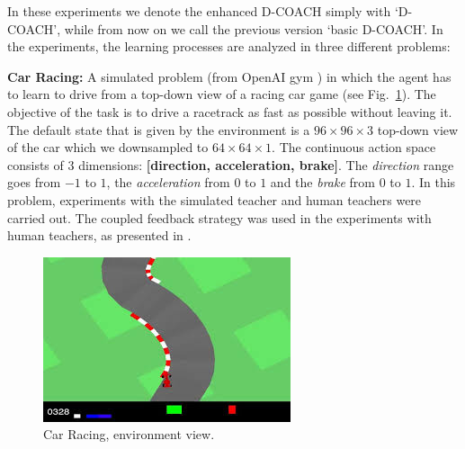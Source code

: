 In these experiments we denote the enhanced D-COACH simply with `D-COACH', while from now on we call the previous version `basic D-COACH'. In the experiments, the learning processes are analyzed in three different problems:

\textbf{Car Racing:} A simulated problem (from OpenAI gym \cite{brockman2016openai}) in which the agent has to learn to drive from a top-down view of a racing car game (see Fig.~\ref{fig:Car_Racing}). The objective of the task is to drive a racetrack as fast as possible without leaving it. The default state that is given by the environment is a $96\times96\times3$ top-down view of the car which we downsampled to $64\times64\times1$. The continuous action space consists of 3 dimensions: \textbf{[direction, acceleration, brake]}. The \emph{direction} range goes from $-1$ to $1$, the \emph{acceleration} from $0$ to $1$ and the \emph{brake} from $0$ to $1$. In this problem, experiments with the simulated teacher and human teachers were carried out. The coupled feedback strategy was used in the experiments with human teachers, as presented in \cite{perez2018interactive}.

\begin{figure}[h]
    \centering
    \includegraphics[scale=0.8]{imagenes/cap3/car_racing_env.jpg}
    \caption{Car Racing, environment view.}
    \label{fig:Car_Racing}
\end{figure}
    
